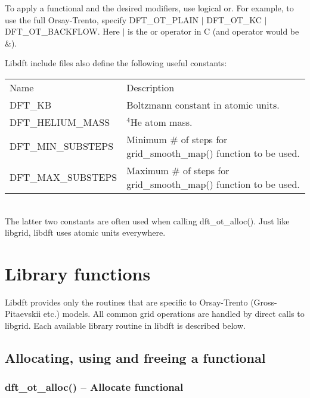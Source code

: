 \documentclass[12pt,letterpaper]{report}
\begin{document}
To apply a functional and the desired modifiers, use logical or. For example, to use the full Orsay-Trento, specify DFT\_OT\_PLAIN $|$ DFT\_OT\_KC $|$ DFT\_OT\_BACKFLOW. Here $|$ is the or operator in C (and operator would be \&).

Libdft include files also define the following useful constants:

\begin{tabular}{ll}
Name & Description\\
\cline{1-2}
DFT\_KB & Boltzmann constant in atomic units.\\
DFT\_HELIUM\_MASS & $^4$He atom mass.\\
DFT\_MIN\_SUBSTEPS & Minimum \# of steps for grid\_smooth\_map() function to be used.\\
DFT\_MAX\_SUBSTEPS & Maximum \# of steps for grid\_smooth\_map() function to be used.\\
\end{tabular}\\

\noindent
The latter two constants are often used when calling dft\_ot\_alloc(). Just like libgrid, libdft uses atomic units everywhere.

\chapter{Library functions}

Libdft provides only the routines that are specific to Orsay-Trento (Gross-Pitaevskii etc.) models. All common grid operations are handled by direct calls to libgrid. Each available library routine in libdft is described below.

\section{Allocating, using and freeing a functional}

\subsection{dft\_ot\_alloc() -- Allocate functional}
\end{document}
